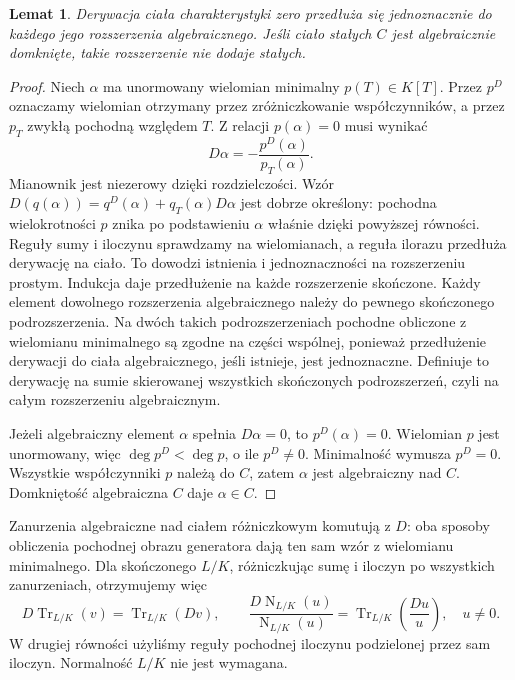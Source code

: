 \documentclass[11pt,a4paper,oneside]{book}
\numberwithin{equation}{section}
\theoremstyle{plain}
\newtheorem{lemat}[twierdzenie]{Lemat}
\theoremstyle{definition}
\theoremstyle{remark}
\newcommand{\Tr}{\operatorname{Tr}}
\newcommand{\Nm}{\operatorname{N}}
\begin{document}
\begin{lemat}
Derywacja ciała charakterystyki zero przedłuża się jednoznacznie do każdego jego rozszerzenia algebraicznego. Jeśli ciało stałych $C$ jest algebraicznie domknięte, takie rozszerzenie nie dodaje stałych.
\end{lemat}
\begin{proof}
Niech $\alpha$ ma unormowany wielomian minimalny $p(T)\in K[T]$. Przez $p^D$ oznaczamy wielomian otrzymany przez zróżniczkowanie współczynników, a przez $p_T$ zwykłą pochodną względem $T$. Z relacji $p(\alpha)=0$ musi wynikać
\[
D\alpha=-\frac{p^D(\alpha)}{p_T(\alpha)}.
\]
Mianownik jest niezerowy dzięki rozdzielczości. Wzór $D(q(\alpha))=q^D(\alpha)+q_T(\alpha)D\alpha$ jest dobrze określony: pochodna wielokrotności $p$ znika po podstawieniu $\alpha$ właśnie dzięki powyższej równości. Reguły sumy i iloczynu sprawdzamy na wielomianach, a reguła ilorazu przedłuża derywację na ciało. To dowodzi istnienia i jednoznaczności na rozszerzeniu prostym. Indukcja daje przedłużenie na każde rozszerzenie skończone. Każdy element dowolnego rozszerzenia algebraicznego należy do pewnego skończonego podrozszerzenia. Na dwóch takich podrozszerzeniach pochodne obliczone z wielomianu minimalnego są zgodne na części wspólnej, ponieważ przedłużenie derywacji do ciała algebraicznego, jeśli istnieje, jest jednoznaczne. Definiuje to derywację na sumie skierowanej wszystkich skończonych podrozszerzeń, czyli na całym rozszerzeniu algebraicznym.

Jeżeli algebraiczny element $\alpha$ spełnia $D\alpha=0$, to $p^D(\alpha)=0$. Wielomian $p$ jest unormowany, więc $\deg p^D<\deg p$, o ile $p^D\ne0$. Minimalność wymusza $p^D=0$. Wszystkie współczynniki $p$ należą do $C$, zatem $\alpha$ jest algebraiczny nad $C$. Domkniętość algebraiczna $C$ daje $\alpha\in C$.
\end{proof}

Zanurzenia algebraiczne nad ciałem różniczkowym komutują z $D$: oba sposoby obliczenia pochodnej obrazu generatora dają ten sam wzór z wielomianu minimalnego. Dla skończonego $L/K$, różniczkując sumę i iloczyn po wszystkich zanurzeniach, otrzymujemy więc
\begin{equation}\label{eq:trace-norm}
D\Tr_{L/K}(v)=\Tr_{L/K}(Dv),\qquad
\frac{D\Nm_{L/K}(u)}{\Nm_{L/K}(u)}
=\Tr_{L/K}\!\left(\frac{Du}{u}\right),\quad u\ne0.
\end{equation}
W drugiej równości użyliśmy reguły pochodnej iloczynu podzielonej przez sam iloczyn. Normalność $L/K$ nie jest wymagana.
\end{document}
